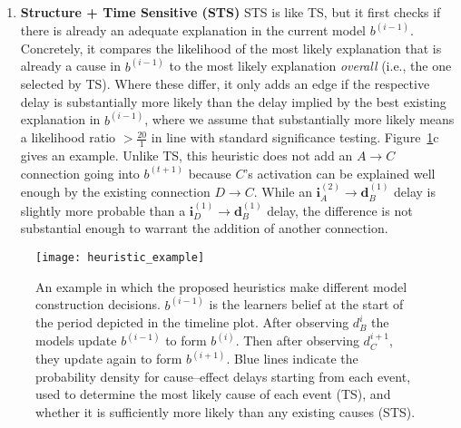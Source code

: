 \documentclass[10pt,letterpaper]{article}
\newcommand{\ci}{\mathbf{i}} %
\newcommand{\da}{\mathbf{d}} %
\begin{document}
\begin{enumerate}
\item \textbf{Structure + Time Sensitive (STS)} STS is like TS, but it first checks if there is already an adequate explanation in the current model $b^{(i-1)}$.  Concretely, it compares the likelihood of the most likely explanation that is already a cause in $b^{(i-1)}$ to the most likely explanation \emph{overall} (i.e., the one selected by TS).  Where these differ, it only adds an edge if the respective delay is substantially more likely than the delay implied by the best existing explanation in $b^{(i-1)}$, where we assume that substantially more likely means a likelihood ratio $>\frac{20}{1}$ in line with standard significance testing.  %
Figure~\ref{fig:heuristic_example}c gives an example.  Unlike TS, this heuristic does not add an $A\rightarrow C$ connection going into $b^{(t+1)}$ because $C$'s activation can be explained well enough by the existing connection $D\rightarrow C$.  While an $\ci^{(2)}_A\rightarrow \da^{(1)}_B$ delay is slightly more probable than a $\ci^{(1)}_D\rightarrow \da^{(1)}_B$ delay, the difference is not substantial enough to warrant the addition of another connection.
\end{enumerate}

\begin{figure}[t!]
   \centering
   \texttt{[image: heuristic\_example]}
   \caption[Continuous Time Causal Learning Heuristics]{An example in which the proposed heuristics make different model construction decisions.  $b^{(i-1)}$ is the learners belief at the start of the period depicted in the timeline plot.  After observing $d_B^{i}$ the models update $b^{(i-1)}$ to form $b^{(i)}$.  Then after observing $d_C^{i+1}$, they update again to form $b^{(i+1)}$.  Blue lines indicate the probability density for cause--effect delays starting from each event, used to determine the most likely cause of each event (TS), and whether it is sufficiently more likely than any existing causes (STS).}
   \label{fig:heuristic_example}
   \vspace{-0.6cm}
\end{figure}
\end{document}
